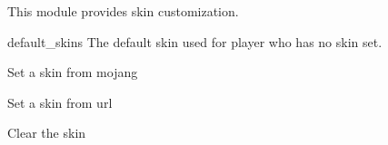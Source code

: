 This module provides skin customization.


\begin{Configuration}
    \item[default\_skins]{
        The default skin used for player who has no skin set.
    }
\end{Configuration}


\begin{example}{Set a skin from mojang}
\end{example}

\begin{example}{Set a skin from url}
\end{example}

\begin{example}{Clear the skin}
\end{example}
